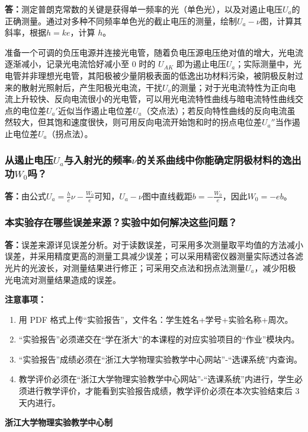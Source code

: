\documentclass[10pt,a4paper]{ctexart}
\newcommand{\sihao}{\fontsize{14pt}{18pt}\selectfont}
\newcommand{\xiaosi}{\fontsize{12pt}{16pt}\selectfont}
\begin{document}
    \textbf{答：}测定普朗克常数的关键是获得单一频率的光（单色光），以及对遏止电压\(U_a\)的正确测量。通过对多种不同频率单色光的截止电压的测量，绘制\(U_a - \nu\)图，计算其斜率，根据\(h = ke\)，计算 $h$。
  
    准备一个可调的负压电源并连接光电管，随着负电压源电压绝对值的增大，光电流逐渐减小，记录光电流恰好减小至 0 时的 $U_{AK}$ 即为遏止电压\(U_a\)；实际测量中，光电管并非理想光电管，其阳极被少量阴极表面的低逸出功材料污染，被阴极反射过来的散射光照射后，产生阳极光电流，干扰\(U_a\)的测量；对于光电流特性为正向电流上升较快、反向电流很小的光电管，可以用光电流特性曲线与暗电流特性曲线交点的电位差\(U_a'\)近似当作遏止电位差\(U_a\)（交点法）；若反向特性曲线的反向电流虽然较大，但其饱和速度很快，则可用反向电流开始饱和时的拐点电位差\(U_a''\)当作遏止电位差\(U_a\)（拐点法）。
    
    \subsubsection*{从遏止电压\(U_a\)与入射光的频率\(\nu\)的关系曲线中你能确定阴极材料的逸出功\(W_0\)吗？}

    \textbf{答：}由公式\(U_a = \frac{h}{e}\nu - \frac{W_0}{e}\)可知，\(U_a - \nu\)图中直线截距\(b = -\frac{W_0}{e}\)，因此\(W_0 = -eb\)。

    \subsubsection*{本实验存在哪些误差来源？实验中如何解决这些问题？}

    \textbf{答：}误差来源详见误差分析。对于读数误差，可采用多次测量取平均值的方法减小误差，并采用精度更高的测量工具减少误差；可以采用精密仪器测量实际透过各滤光片的光波长，对测量结果进行修正；可采用交点法和拐点法测量\(U_a\)，减少阳极光电流对测量结果造成的误差。    

\newpage

\sihao\textbf{注意事项：}
\xiaosi
\begin{enumerate}
    \item  用 PDF 格式上传“实验报告”，文件名：学生姓名+学号+实验名称+周次。
    \item  “实验报告”必须递交在“学在浙大”的本课程的对应实验项目的“作业”模块内。
    \item  “实验报告”成绩必须在“浙江大学物理实验教学中心网站”-“选课系统”内查询。
    \item 教学评价必须在“浙江大学物理实验教学中心网站”-“选课系统”内进行，学生必须进行教学评价，才能看到实验报告成绩，教学评价必须在本次实验结束后 3 天内进行。
\end{enumerate}

\vspace{1cm}
\xiaosi\centering \textbf{浙江大学物理实验教学中心制}
\end{document}
